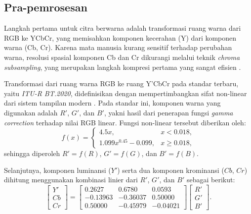\documentclass[a4paper]{article}
\begin{document}
\subsection{Pra-pemrosesan}
Langkah pertama untuk citra berwarna adalah transformasi ruang warna dari RGB ke YCbCr, yang memisahkan komponen kecerahan (Y) dari komponen warna (Cb, Cr). Karena mata manusia kurang sensitif terhadap perubahan warna, resolusi spasial komponen Cb dan Cr dikurangi melalui teknik \textit{chroma subsampling}, yang merupakan langkah kompresi pertama yang sangat efisien \cite{wallace1991jpeg}.

Transformasi dari ruang warna RGB ke ruang Y'CbCr pada standar terbaru, yaitu \textit{ITU-R BT.2020},
didefinisikan dengan mempertimbangkan sifat non-linear dari sistem tampilan modern \cite{itu2020}.
Pada standar ini, komponen warna yang digunakan adalah $R'$, $G'$, dan $B'$,
yakni hasil dari penerapan fungsi \textit{gamma correction} terhadap nilai RGB linear.
Fungsi non-linear tersebut diberikan oleh:
\begin{equation}
  f(x) =
  \begin{cases}
    4.5x,                  & x < 0.018,   \\[4pt]
    1.099x^{0.45} - 0.099, & x \ge 0.018,
  \end{cases}
\end{equation}
sehingga diperoleh $R' = f(R)$, $G' = f(G)$, dan $B' = f(B)$.

Selanjutnya, komponen luminansi ($Y'$) serta dua komponen krominansi ($Cb$, $Cr$) dihitung menggunakan kombinasi linier dari $R'$, $G'$, dan $B'$ sebagai berikut:
\begin{equation}
  \begin{bmatrix}
    Y' \\[4pt]
    Cb \\[4pt]
    Cr
  \end{bmatrix}
  =
  \begin{bmatrix}
    0.2627   & 0.6780   & 0.0593   \\[4pt]
    -0.13963 & -0.36037 & 0.50000  \\[4pt]
    0.50000  & -0.45979 & -0.04021
  \end{bmatrix}
  \begin{bmatrix}
    R' \\[4pt]
    G' \\[4pt]
    B'
  \end{bmatrix}.
\end{equation}
\end{document}

